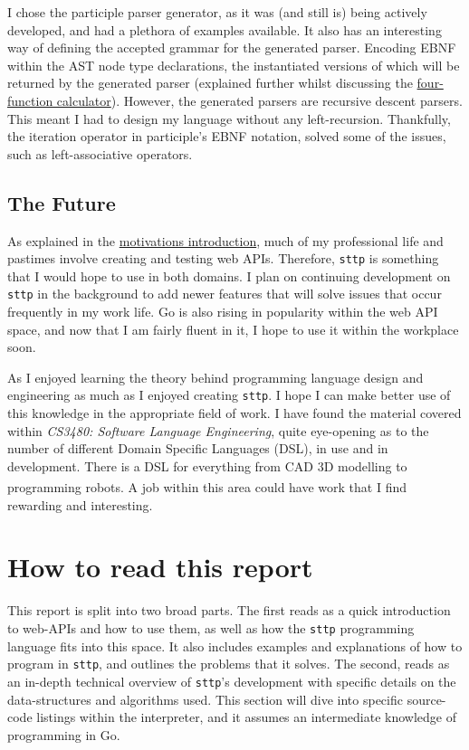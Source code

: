 \documentclass[]{full}
\theoremstyle{definition}
\begin{document}
I chose the participle parser generator, as it was (and still is) being actively developed, and had a plethora of examples available. It also has an interesting way of defining the accepted grammar for the generated parser. Encoding EBNF within the AST node type declarations, the instantiated versions of which will be returned by the generated parser (explained further whilst discussing the \hyperref[sec:four-function-calc]{four-function calculator}). However, the generated parsers are recursive descent parsers. This meant I had to design my language without any left-recursion. Thankfully, the iteration operator in participle's EBNF notation, solved some of the issues, such as left-associative operators.

\section{The Future}

As explained in the \hyperref[chap:motivations]{motivations introduction}, much of my professional life and pastimes involve creating and testing web APIs. Therefore, \verb|sttp| is something that I would hope to use in both domains. I plan on continuing development on \verb|sttp| in the background to add newer features that will solve issues that occur frequently in my work life. Go is also rising in popularity within the web API space, and now that I am fairly fluent in it, I hope to use it within the workplace soon.

As I enjoyed learning the theory behind programming language design and engineering as much as I enjoyed creating \verb|sttp|. I hope I can make better use of this knowledge in the appropriate field of work. I have found the material covered within \textit{CS3480: Software Language Engineering}, quite eye-opening as to the number of different Domain Specific Languages (DSL), in use and in development. There is a DSL for everything from CAD 3D modelling to programming robots\textsuperscript{\cite{nordmann_hochgeschwender_wrede_2014}}. A job within this area could have work that I find rewarding and interesting.

\chapter{How to read this report}

This report is split into two broad parts. The first reads as a quick introduction to web-APIs and how to use them, as well as how the \verb|sttp| programming language fits into this space. It also includes examples and explanations of how to program in \verb|sttp|, and outlines the problems that it solves. The second, reads as an in-depth technical overview of \verb|sttp|'s development with specific details on the data-structures and algorithms used. This section will dive into specific source-code listings within the interpreter, and it assumes an intermediate knowledge of programming in Go.
\end{document}
